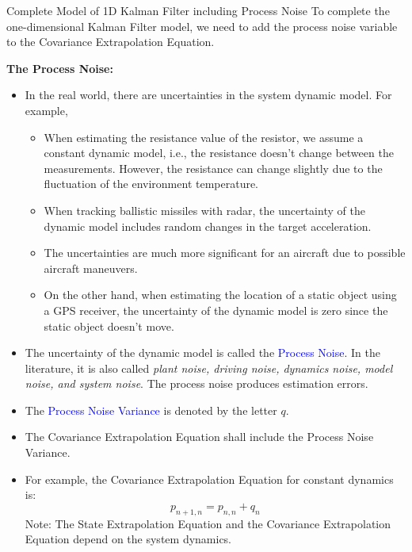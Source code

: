 \begin{frame}{Complete Model of 1D Kalman Filter including Process Noise}
To complete the one-dimensional Kalman Filter model, we need to add the process noise variable to the Covariance Extrapolation Equation.

\textbf{The Process Noise:}

\begin{itemize}
    \item In the real world, there are uncertainties in the system dynamic model. For example, 
    \begin{itemize}
        \item  When estimating the resistance value of the resistor, we assume a constant dynamic model, i.e., the resistance doesn't change between the measurements. However, the resistance can change slightly due to the fluctuation of the environment temperature.
        
        \item When tracking ballistic missiles with radar, the uncertainty of the dynamic model includes random changes in the target acceleration. 
        
        \item The uncertainties are much more significant for an aircraft due to possible aircraft maneuvers.
        
        \item On the other hand, when estimating the location of a static object using a GPS receiver, the uncertainty of the dynamic model is zero since the static object doesn't move.
    \end{itemize}
    \item The uncertainty of the dynamic model is called the \textcolor{blue}{Process Noise}. In the literature, it is also called \textit{plant noise, driving noise, dynamics noise, model noise, and system noise}. The process noise produces estimation errors.
    
    \item The \textcolor{blue}{Process Noise Variance} is denoted by the letter $q$.
    
    \item The Covariance Extrapolation Equation shall include the Process Noise Variance.
    
    \item For example, the Covariance Extrapolation Equation for constant dynamics is:
    $$p_{n+1,n} = p_{n,n} + q_n$$
    Note: The State Extrapolation Equation and the Covariance Extrapolation Equation depend on the system dynamics.
\end{itemize}
    
\end{frame}



